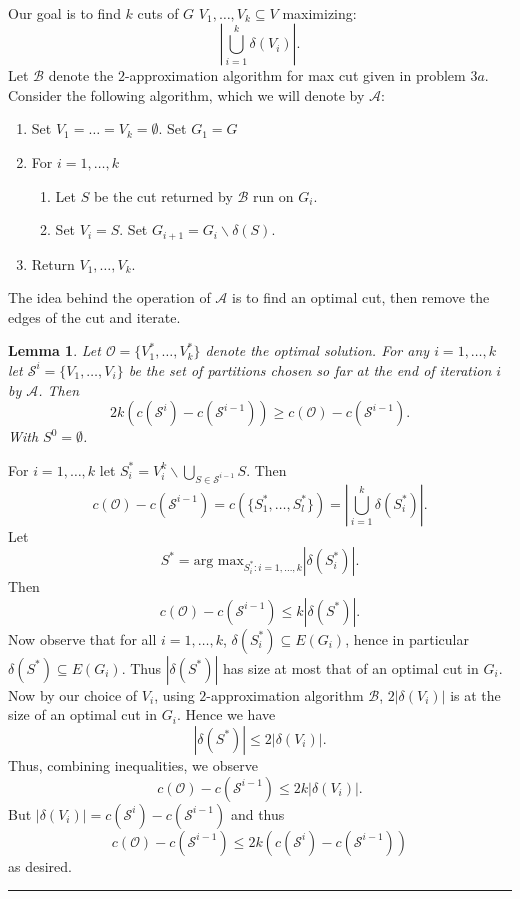 \documentclass[letterpaper,12pt,oneside,onecolumn]{article}
\newcommand{\cA}{\mathcal{A}} \newcommand{\cB}{\mathcal{B}}
\newcommand{\cO}{\mathcal{O}} \newcommand{\cP}{\mathcal{P}}
\newcommand{\cS}{\mathcal{S}} \newcommand{\cT}{\mathcal{T}}
\newenvironment{proof}{{\bf Proof:  }}{\hfill\rule{2mm}{2mm}}
\newtheorem{lemma}[fact]{Lemma}
\begin{document}
\paragraph{}
Our goal is to find $k$ cuts of $G$ $V_1, \dots, V_k \subseteq V$ maximizing:
$$|\bigcup_{i=1}^k \delta(V_i)|.$$
Let $\cB$ denote the $2$-approximation algorithm for max cut given in problem $3a$. Consider the following algorithm, which we will denote by $\cA$:
\begin{enumerate}
\item Set $V_1 = \dots = V_k = \emptyset$. Set $G_1 = G$
\item For $i = 1, \dots, k$
\begin{enumerate}
\item Let $S$ be the cut returned by $\cB$ run on $G_i$.
\item Set $V_i = S$. Set $G_{i+1} = G_i \backslash \delta(S).$
\end{enumerate}
\item Return $V_1, \dots, V_k$.
\end{enumerate}
The idea behind the operation of $\cA$ is to find an optimal cut, then remove the edges of the cut and iterate.
\begin{lemma}\label{lemma:3b1}
Let $\cO = \{V^*_1, \dots, V^*_k\}$ denote the optimal solution. For any $i=1,\dots, k$ let $\cS^i = \{V_1, \dots, V_{i}\}$ be the set of partitions chosen so far at the end of iteration $i$ by $\cA$. Then 
$$2k(c(\cS^i) - c(\cS^{i-1})) \geq c(\cO) - c(\cS^{i-1}).$$
With $S^0 = \emptyset$.
\end{lemma}
\begin{proof}
For $i = 1,\dots, k$ let $S_i^* = V_i^k \backslash \bigcup_{S\in \cS^{i-1}} S$. Then
$$c(\cO) - c(\cS^{i-1}) = c(\{S^*_1,\dots, S^*_l\}) = |\bigcup_{i=1}^k \delta(S^*_i)|.$$
Let $$S^* = \text{arg max}_{S^*_i : i=1,\dots, k} |\delta(S^*_i)|.$$
Then 
$$c(\cO) - c(\cS^{i-1}) \leq k|\delta(S^*)|.$$
Now observe that for all $i = 1,\dots, k$, $\delta(S^*_i) \subseteq E(G_i)$, hence in particular $\delta(S^*) \subseteq E(G_i)$. Thus $|\delta(S^*)|$ has size at most that of an optimal cut in $G_i$. Now by our choice of $V_i$, using $2$-approximation algorithm $\cB$, $2|\delta(V_i)|$ is at the size of an optimal cut in $G_i$. Hence we have
$$|\delta(S^*)| \leq 2|\delta(V_i)|.$$
Thus, combining inequalities, we observe
$$c(\cO) - c(\cS^{i-1}) \leq 2k |\delta(V_i)|.$$
But $|\delta(V_i)| = c(\cS^i) - c(\cS^{i-1})$ and thus
$$c(\cO) - c(\cS^{i-1}) \leq 2k (c(\cS^i) - c(\cS^{i-1}))$$
as desired.
\end{proof}
\end{document}
